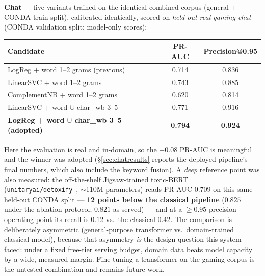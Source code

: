 \documentclass[11pt,a4paper]{article}
\begin{document}
\textbf{Chat} --- five variants trained on the identical combined corpus
(general + CONDA train split), calibrated identically, scored on \emph{held-out real
gaming chat} (CONDA validation split; model-only scores):
\begin{center}
\begin{tabular}{lcc}
\toprule
\textbf{Candidate} & \textbf{PR-AUC} & \textbf{Precision@0.95} \\
\midrule
LogReg + word 1--2 grams (previous)     & 0.714 & 0.836 \\
LinearSVC + word 1--2 grams             & 0.743 & 0.885 \\
ComplementNB + word 1--2 grams          & 0.620 & 0.814 \\
LinearSVC + word $\cup$ char\_wb 3--5   & 0.771 & 0.916 \\
\textbf{LogReg + word $\cup$ char\_wb 3--5 (adopted)} & \textbf{0.794} & \textbf{0.924} \\
\bottomrule
\end{tabular}
\end{center}
Here the evaluation is real and in-domain, so the $+0.08$ PR-AUC is meaningful and
the winner was adopted (\S\ref{sec:chatresults} reports the deployed pipeline's final
numbers, which also include the keyword fusion). A \emph{deep} reference point was
also measured: the off-the-shelf Jigsaw-trained toxic-BERT
(\texttt{unitaryai/detoxify}~\cite{detoxify2020}, $\sim$110M parameters) reads PR-AUC $\mathbf{0.709}$
on this same held-out CONDA split --- \textbf{12 points below the
classical pipeline} ($0.825$ under the ablation protocol; $0.821$ as served) --- and at a $\geq$$0.95$-precision operating point
its recall is $0.12$ vs.\ the classical $0.42$. The comparison is deliberately
asymmetric (general-purpose transformer vs.\ domain-trained classical model),
because that asymmetry \emph{is} the design question this system faced: under a
fixed free-tier serving budget, domain data beats model capacity by a wide,
measured margin. Fine-tuning a transformer on the gaming corpus is the untested
combination and remains future work.
\end{document}
